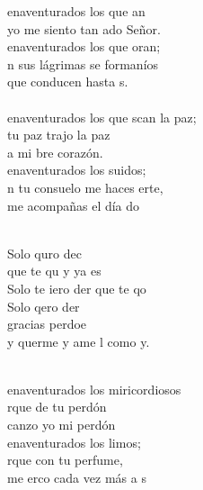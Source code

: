 \begin{cancion}%
	enaventurados los que an\\
	yo me siento tan ado Señor.\\
	enaventurados los que oran;\\
	n sus lágrimas se formaníos\\
	que conducen hasta s.   \\
\jump\\
	enaventurados los que scan la paz;\\
	tu paz trajo la paz\\
	a mi bre corazón.\\
	enaventurados los suidos;\\
	n tu consuelo me haces erte,\\
	me acompañas el día do \\\jump\\
	\begin{chorus}%
	Solo quro dec\\
	que te qu y ya es\\
	Solo te iero der que te qo\\
	Solo qero der\\
	gracias perdoe\\
	y querme y ame l como y.\\
	\end{chorus}%
	\jump\\
	enaventurados los miricordiosos\\
	rque de tu perdón \\
	canzo yo mi perdón\\
	enaventurados los limos;\\
	rque con tu perfume,\\
	me erco cada vez más a s \\

\end{cancion}
